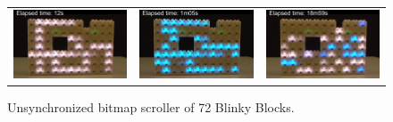 {
	\newcommand{\subFigureWidth}{0.32\linewidth}
	\begin{figure}[h!]
		\centering			
		\small
		\begin{tabular}{c c c}
			\includegraphics[width=\subFigureWidth]{images/time-synchronization/scroller/unsync_12s}  &
			\includegraphics[width=\subFigureWidth]{images/time-synchronization/scroller/unsync_1m05s} & 
			\includegraphics[width=\subFigureWidth]{images/time-synchronization/scroller/unsync_18m59s}
			
		\end{tabular}	
		\caption{Unsynchronized bitmap scroller of 72 Blinky Blocks.\label{fig:time-sync:unsync-bitmap-scroller}}
	\end{figure}
}

